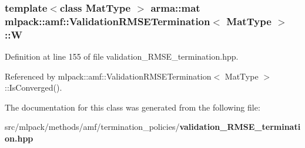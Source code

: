 \subsubsection[{W}]{\setlength{\rightskip}{0pt plus 5cm}template$<$class Mat\-Type $>$ arma\-::mat {\bf mlpack\-::amf\-::\-Validation\-R\-M\-S\-E\-Termination}$<$ Mat\-Type $>$\-::W\hspace{0.3cm}{\ttfamily [private]}}\label{classmlpack_1_1amf_1_1ValidationRMSETermination_abd7ae3704f27e121e05367c6d16415e7}


Definition at line 155 of file validation\-\_\-\-R\-M\-S\-E\-\_\-termination.\-hpp.



Referenced by mlpack\-::amf\-::\-Validation\-R\-M\-S\-E\-Termination$<$ Mat\-Type $>$\-::\-Is\-Converged().



The documentation for this class was generated from the following file\-:\begin{DoxyCompactItemize}
\item 
src/mlpack/methods/amf/termination\-\_\-policies/{\bf validation\-\_\-\-R\-M\-S\-E\-\_\-termination.\-hpp}\end{DoxyCompactItemize}
